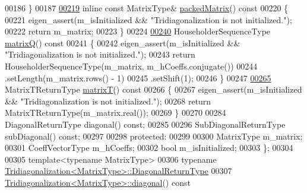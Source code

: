 \begin{DoxyCode}
00186     \}
00187 
\hyperlink{group___eigenvalues___module_a47858b3895e64acafb1bb2e97f98a154}{00219}     \textcolor{keyword}{inline} \textcolor{keyword}{const} MatrixType& \hyperlink{group___eigenvalues___module_a47858b3895e64acafb1bb2e97f98a154}{packedMatrix}()\textcolor{keyword}{ const}
00220 \textcolor{keyword}{    }\{
00221       eigen\_assert(m\_isInitialized && \textcolor{stringliteral}{"Tridiagonalization is not initialized."});
00222       \textcolor{keywordflow}{return} m\_matrix;
00223     \}
00224 
\hyperlink{group___eigenvalues___module_a000f7392eda930576ffd2af1fae54af2}{00240}     HouseholderSequenceType \hyperlink{group___eigenvalues___module_a000f7392eda930576ffd2af1fae54af2}{matrixQ}()\textcolor{keyword}{ const}
00241 \textcolor{keyword}{    }\{
00242       eigen\_assert(m\_isInitialized && \textcolor{stringliteral}{"Tridiagonalization is not initialized."});
00243       \textcolor{keywordflow}{return} HouseholderSequenceType(m\_matrix, m\_hCoeffs.conjugate())
00244              .setLength(m\_matrix.rows() - 1)
00245              .setShift(1);
00246     \}
00247 
\hyperlink{group___eigenvalues___module_a6eb5ef94b8b9bb013c0e69b6df56d0df}{00265}     MatrixTReturnType \hyperlink{group___eigenvalues___module_a6eb5ef94b8b9bb013c0e69b6df56d0df}{matrixT}()\textcolor{keyword}{ const}
00266 \textcolor{keyword}{    }\{
00267       eigen\_assert(m\_isInitialized && \textcolor{stringliteral}{"Tridiagonalization is not initialized."});
00268       \textcolor{keywordflow}{return} MatrixTReturnType(m\_matrix.real());
00269     \}
00270 
00284     DiagonalReturnType diagonal() \textcolor{keyword}{const};
00285 
00296     SubDiagonalReturnType subDiagonal() \textcolor{keyword}{const};
00297 
00298   \textcolor{keyword}{protected}:
00299 
00300     MatrixType m\_matrix;
00301     CoeffVectorType m\_hCoeffs;
00302     \textcolor{keywordtype}{bool} m\_isInitialized;
00303 \};
00304 
00305 \textcolor{keyword}{template}<\textcolor{keyword}{typename} MatrixType>
00306 \textcolor{keyword}{typename} \hyperlink{class_eigen_1_1internal_1_1_tensor_lazy_evaluator_writable}{Tridiagonalization<MatrixType>::DiagonalReturnType}
00307 \hyperlink{group___eigenvalues___module_a0b7ff4860aa6f7c0761b1059c012fd8e}{Tridiagonalization<MatrixType>::diagonal}()\textcolor{keyword}{ const}

\end{DoxyCode}
